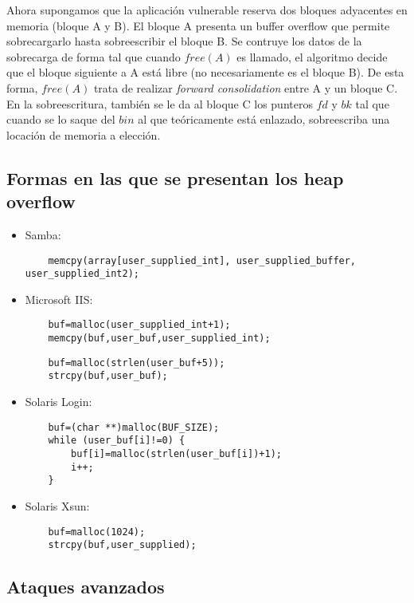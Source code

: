 	Ahora supongamos que la aplicaci\'on vulnerable reserva dos bloques adyacentes en memoria (bloque A y B). El bloque A presenta un buffer overflow que permite sobrecargarlo hasta sobreescribir el bloque B. Se contruye los datos de la sobrecarga de forma tal que cuando $free(A)$ es llamado, el algoritmo decide que el bloque siguiente a A est\'a libre (no necesariamente es el bloque B). De esta forma, $free(A)$ trata de realizar {\em forward consolidation} entre A y un bloque C. En la sobreescritura, tambi\'en se le da al bloque C los punteros $fd$ y $bk$ tal que cuando se lo saque del $bin$ al que te\'oricamente est\'a enlazado, sobreescriba una locaci\'on de memoria a elecci\'on.
	
	\subsection{Formas en las que se presentan los heap overflow}
	
	\begin{itemize}
	\item Samba:
		\begin{lstlisting}
	memcpy(array[user_supplied_int], user_supplied_buffer, user_supplied_int2);
		\end{lstlisting}
	\item Microsoft IIS:
		\begin{lstlisting}
	buf=malloc(user_supplied_int+1);
	memcpy(buf,user_buf,user_supplied_int);
		\end{lstlisting}
	
		\begin{lstlisting}
	buf=malloc(strlen(user_buf+5));
	strcpy(buf,user_buf);
		\end{lstlisting}
	\item Solaris Login:
		\begin{lstlisting}
	buf=(char **)malloc(BUF_SIZE);
	while (user_buf[i]!=0) {
		buf[i]=malloc(strlen(user_buf[i])+1);
		i++;
	}
		\end{lstlisting}
	\item Solaris Xsun:
		\begin{lstlisting}
	buf=malloc(1024);
	strcpy(buf,user_supplied);
		\end{lstlisting}
	\end{itemize}
	
	\subsection{Ataques avanzados}
	

